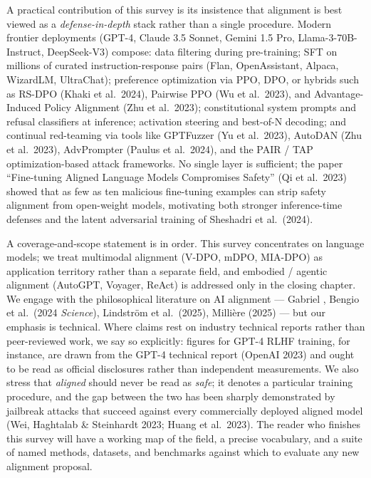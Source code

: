 \documentclass{article}
\begin{document}
A practical contribution of this survey is its insistence that alignment is best viewed as a \emph{defense-in-depth} stack rather than a single procedure. Modern frontier deployments (GPT-4, Claude 3.5 Sonnet, Gemini 1.5 Pro, Llama-3-70B-Instruct, DeepSeek-V3) compose: data filtering during pre-training; SFT on millions of curated instruction-response pairs (Flan, OpenAssistant, Alpaca, WizardLM, UltraChat); preference optimization via PPO, DPO, or hybrids such as RS-DPO (Khaki et al.~2024), Pairwise PPO (Wu et al.~2023), and Advantage-Induced Policy Alignment (Zhu et al.~2023); constitutional system prompts and refusal classifiers at inference; activation steering and best-of-N decoding; and continual red-teaming via tools like GPTFuzzer (Yu et al.~2023), AutoDAN (Zhu et al.~2023), AdvPrompter (Paulus et al.~2024), and the PAIR / TAP optimization-based attack frameworks. No single layer is sufficient; the paper ``Fine-tuning Aligned Language Models Compromises Safety'' (Qi et al.~2023) showed that as few as ten malicious fine-tuning examples can strip safety alignment from open-weight models, motivating both stronger inference-time defenses and the latent adversarial training of Sheshadri et al.~(2024).

A coverage-and-scope statement is in order. This survey concentrates on language models; we treat multimodal alignment (V-DPO, mDPO, MIA-DPO) as application territory rather than a separate field, and embodied / agentic alignment (AutoGPT, Voyager, ReAct) is addressed only in the closing chapter. We engage with the philosophical literature on AI alignment --- Gabriel \citet{gabriel2020artificialintellig}, Bengio et al.~(2024 \emph{Science}), Lindström et al.~(2025), Millière (2025) --- but our emphasis is technical. Where claims rest on industry technical reports rather than peer-reviewed work, we say so explicitly: figures for GPT-4 RLHF training, for instance, are drawn from the GPT-4 technical report (OpenAI 2023) and ought to be read as official disclosures rather than independent measurements. We also stress that \emph{aligned} should never be read as \emph{safe}; it denotes a particular training procedure, and the gap between the two has been sharply demonstrated by jailbreak attacks that succeed against every commercially deployed aligned model (Wei, Haghtalab \& Steinhardt 2023; Huang et al.~2023). The reader who finishes this survey will have a working map of the field, a precise vocabulary, and a suite of named methods, datasets, and benchmarks against which to evaluate any new alignment proposal.
\end{document}
